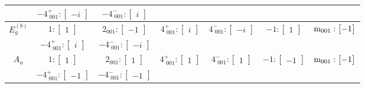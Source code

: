 \documentclass[fleqn,8pt,landscape]{jsarticle}
\begin{document}
\begin{longtable}{ccccccc}
& $ -4^{+}_{\,\,001}:\begin{bmatrix} - i \end{bmatrix} $ & $ -4^{-}_{\,\,001}:\begin{bmatrix} i \end{bmatrix} $ & $  $ & $  $ & $  $ & $  $ \\ \hline
$ E_{g}^{(b)} $ & $ 1:\begin{bmatrix} 1 \end{bmatrix} $ & $ 2{}_{001}:\begin{bmatrix} -1 \end{bmatrix} $ & $ 4^{+}_{\,\,001}:\begin{bmatrix} i \end{bmatrix} $ & $ 4^{-}_{\,\,001}:\begin{bmatrix} - i \end{bmatrix} $ & $ -1:\begin{bmatrix} 1 \end{bmatrix} $ & $ {\rm m}_{001}:\begin{bmatrix} -1 \end{bmatrix} $ \\
& $ -4^{+}_{\,\,001}:\begin{bmatrix} i \end{bmatrix} $ & $ -4^{-}_{\,\,001}:\begin{bmatrix} - i \end{bmatrix} $ & $  $ & $  $ & $  $ & $  $ \\ \hline
$ A_{u} $ & $ 1:\begin{bmatrix} 1 \end{bmatrix} $ & $ 2{}_{001}:\begin{bmatrix} 1 \end{bmatrix} $ & $ 4^{+}_{\,\,001}:\begin{bmatrix} 1 \end{bmatrix} $ & $ 4^{-}_{\,\,001}:\begin{bmatrix} 1 \end{bmatrix} $ & $ -1:\begin{bmatrix} -1 \end{bmatrix} $ & $ {\rm m}_{001}:\begin{bmatrix} -1 \end{bmatrix} $ \\
& $ -4^{+}_{\,\,001}:\begin{bmatrix} -1 \end{bmatrix} $ & $ -4^{-}_{\,\,001}:\begin{bmatrix} -1 \end{bmatrix} $ & $  $ & $  $ & $  $ & $  $ \\ \hline

\end{longtable}
\end{document}
